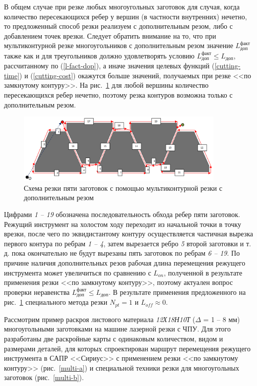 \documentclass[11pt,twoside,openany]{report}
\begin{document}
В общем случае при резке любых многоугольных
заготовок для случая,
когда количество пересекающихся ребер у вершин
(в частности внутренних) нечетно,
то предложенный способ резки реализуем с
дополнительным резом, либо с добавлением точек врезки.
Следует обратить внимание на то,
что при мультиконтурной резке многоугольников с
дополнительным резом значение
$L_\text{доп}^\text{факт}$
также как и для треугольников должно удовлетворять условию
$L_\text{доп}^\text{факт} \leqslant L_\text{доп}$,
рассчитанному по (\ref{l-fact-dop}),
а иначе значения целевых функций (\ref{cutting-time})
и (\ref{cutting-cost})
окажутся больше значений,
получаемых  при резке <<по замкнутому контуру>>.
На рис.~\ref{5-extra}
для любой вершины количество пересекающихся ребер нечетно,
поэтому резка контуров возможна только с дополнительным резом.

\begin{figure}[h]
  \begin{center}
  \includegraphics[width=0.9\textwidth]{5-extra.png}
  \caption{Схема резки пяти заготовок с помощью мультиконтурной резки с дополнительным резом}
  \label{5-extra}
  \end{center}
\end{figure}

Цифрами {\it 1 -- 19} обозначена последовательность обхода ребер
пяти заготовок.
Режущий инструмент на холостом ходу переходит
из начальной точки в точку врезки,
после чего по эквидистантому контуру
осуществляется частичная вырезка первого
контура по ребрам {\it 1 -- 4},
затем вырезается ребро {\it 5} второй заготовки и т. д.
пока окончательно не будут вырезаны пять заготовок по ребрам
{\it 6 -- 19}.
По причине наличия дополнительных резов рабочая
длина перемещения режущего инструмента может увеличиться по сравнению с $L_{on}$,
полученной в результате применения резки <<по замкнутому контуру>>,
поэтому актуален вопрос проверки неравенства
$L_\text{доп}^\text{факт} \leqslant L_\text{доп}$.
В результате применения предложенного на рис.~\ref{5-extra}
специального метода резки
$N_{pt}=1$
и $L_{off} \approx 0$.

Рассмотрим пример раскроя листового материала
{\it 12Х18Н10Т}
($\Delta$ = 1 -- 8 мм)
многоугольными заготовками на машине лазерной резки с ЧПУ.
Для этого разработаны две раскройные карты с одинаковым количеством,
видом и размерами деталей,
для которых спроектирован маршрут перемещения
режущего инструмента в САПР <<Сириус>> с
применением резки <<по замкнутому контуру>>
(рис.~\ref{multi-a})
и специальной техники резки для многоугольных заготовок
(рис.~\ref{multi-b}).
\end{document}
